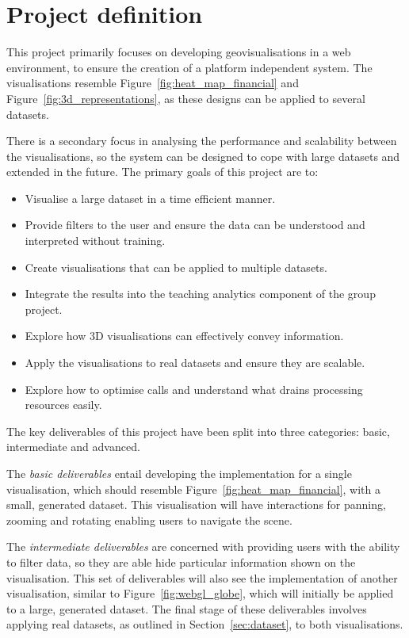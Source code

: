 \section{Project definition} {
\label{sec:project_definition}

	This project primarily focuses on developing geovisualisations in a web environment, to ensure the creation of a platform independent system. The visualisations resemble Figure~\ref{fig:heat_map_financial} and Figure~\ref{fig:3d_representations}, as these designs can be applied to several datasets.

	

	There is a secondary focus in analysing the performance and scalability between the visualisations, so the system can be designed to cope with large datasets and extended in the future. The primary goals of this project are to:

	\begin{itemize}
		\item Visualise a large dataset in a time efficient manner.
		\item Provide filters to the user and ensure the data can be understood and interpreted without training.
		\item Create visualisations that can be applied to multiple datasets.
		\item Integrate the results into the teaching analytics component of the group project.
		\item Explore how 3D visualisations can effectively convey information.
		\item Apply the visualisations to real datasets and ensure they are scalable.
		\item Explore how to optimise calls and understand what drains processing resources easily.
	\end{itemize}

	The key deliverables of this project have been split into three categories: basic, intermediate and advanced.

	The \emph{basic deliverables} entail developing the implementation for a single visualisation, which should resemble Figure~\ref{fig:heat_map_financial}, with a small, generated dataset. This visualisation will have interactions for panning, zooming and rotating enabling users to navigate the scene.

	The \emph{intermediate deliverables} are concerned with providing users with the ability to filter data, so they are able hide particular information shown on the visualisation. This set of deliverables will also see the implementation of another visualisation, similar to Figure~\ref{fig:webgl_globe}, which will initially be applied to a large, generated dataset. The final stage of these deliverables involves applying real datasets, as outlined in Section~\ref{sec:dataset}, to both visualisations.

}
